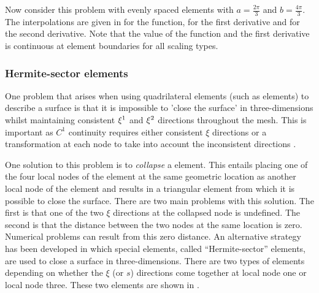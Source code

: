 Now consider this problem with evenly spaced elements \ie with
$a=\frac{2\pi}{3}$ and $b=\frac{4\pi}{3}$. The interpolations are given in
 for the function, 
for the first derivative and  for the second
derivative. Note that the value of the function and the first derivative is
continuous at element boundaries for all scaling types.


\subsubsection{Hermite-sector elements}
\label{sec:hselements}

One problem that arises when using quadrilateral elements (such as
\bicubicherm elements) to describe a surface is that it is impossible to
'close the surface' in three-dimensions whilst maintaining consistent $\xi^{1}$
and $\xi^{2}$ directions throughout the mesh. This is important as $C^{1}$
continuity requires either consistent $\xi$ directions or a transformation at
each node to take into account the inconsistent directions \citep{petera:1994}.

One solution to this problem is to \emph{collapse} a \bicubicherm element.
This entails placing one of the four local nodes of the element at the same
geometric location as another local node of the element and results in a
triangular element from which it is possible to close the surface. There are
two main problems with this solution.  The first is that one of the two $\xi$
directions at the collapsed node is undefined.  The second is that the
distance between the two nodes at the same location is zero.  Numerical
problems can result from this zero distance.  An alternative strategy has
been developed in which special elements, called ``Hermite-sector''
elements, are used to close a \bicubicherm
surface in three-dimensions. There are two types of elements depending on
whether the $\xi$ (or $s$) directions come together at local node one or local
node three.  These two elements are shown in .

